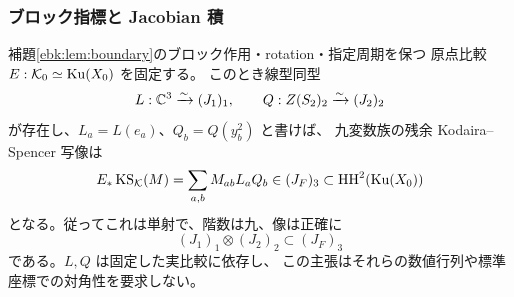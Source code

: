 \subsubsection{ブロック指標と Jacobian 積}

\begin{theorem}[残余接写像の階数と像]
\label{ift:thm:rank-nine}
補題\ref{ebk:lem:boundary}のブロック作用・rotation・指定周期を保つ
原点比較 $E:\mathcal K_0\simeq\operatorname{Ku}(X_0)$ を固定する。
このとき線型同型
\[
 L:\mathbb C^3\xrightarrow{\sim}(J_1)_1,\qquad
 Q:Z(S_2)_2\xrightarrow{\sim}(J_2)_2
\]
が存在し、$L_a=L(e_a)$、$Q_b=Q(y_b^2)$ と書けば、
九変数族の残余 Kodaira--Spencer 写像は
\begin{equation}\label{ift:eq:ks-product}
 E_*\operatorname{KS}_{\mathcal K}(M)
       =\sum_{a,b}M_{ab}L_aQ_b\in(J_F)_3
       \subset\mathrm{HH}^2(\operatorname{Ku}(X_0))
\end{equation}
となる。従ってこれは単射で、階数は九、像は正確に
\begin{equation}\label{ift:eq:ks-image}
                 (J_1)_1\otimes(J_2)_2\subset(J_F)_3
\end{equation}
である。$L,Q$ は固定した実比較に依存し、
この主張はそれらの数値行列や標準座標での対角性を要求しない。
\end{theorem}


